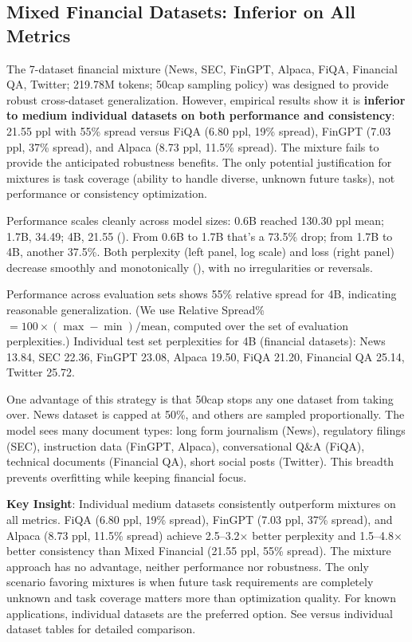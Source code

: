 \subsection{Mixed Financial Datasets: Inferior on All Metrics}

The 7-dataset financial mixture (News, SEC, FinGPT, Alpaca, FiQA, Financial QA, Twitter; 219.78M tokens; 50cap sampling policy) was designed to provide robust cross-dataset generalization. However, empirical results show it is \textbf{inferior to medium individual datasets on both performance and consistency}: 21.55 ppl with 55\% spread versus FiQA (6.80 ppl, 19\% spread), FinGPT (7.03 ppl, 37\% spread), and Alpaca (8.73 ppl, 11.5\% spread). The mixture fails to provide the anticipated robustness benefits. The only potential justification for mixtures is task coverage (ability to handle diverse, unknown future tasks), not performance or consistency optimization.

Performance scales cleanly across model sizes: 0.6B reached 130.30 ppl mean; 1.7B, 34.49; 4B, 21.55 (). From 0.6B to 1.7B that's a 73.5\% drop; from 1.7B to 4B, another 37.5\%. Both perplexity (left panel, log scale) and loss (right panel) decrease smoothly and monotonically (), with no irregularities or reversals.

Performance across evaluation sets shows 55\% relative spread for 4B, indicating reasonable generalization. (We use Relative Spread\% $=100\times(\max-\min)/\text{mean}$, computed over the set of evaluation perplexities.) Individual test set perplexities for 4B (financial datasets): News 13.84, SEC 22.36, FinGPT 23.08, Alpaca 19.50, FiQA 21.20, Financial QA 25.14, Twitter 25.72.

One advantage of this strategy is that 50cap stops any one dataset from taking over. News dataset is capped at 50\%, and others are sampled proportionally. The model sees many document types: long form journalism (News), regulatory filings (SEC), instruction data (FinGPT, Alpaca), conversational Q\&A (FiQA), technical documents (Financial QA), short social posts (Twitter). This breadth prevents overfitting while keeping financial focus.

\textbf{Key Insight}: Individual medium datasets consistently outperform mixtures on all metrics. FiQA (6.80 ppl, 19\% spread), FinGPT (7.03 ppl, 37\% spread), and Alpaca (8.73 ppl, 11.5\% spread) achieve 2.5–3.2$\times$ better perplexity and 1.5–4.8$\times$ better consistency than Mixed Financial (21.55 ppl, 55\% spread). The mixture approach has no advantage, neither performance nor robustness. The only scenario favoring mixtures is when future task requirements are completely unknown and task coverage matters more than optimization quality. For known applications, individual datasets are the preferred option. See  versus individual dataset tables for detailed comparison.

